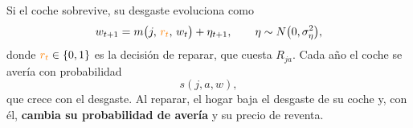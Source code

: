 \documentclass[border=0pt]{standalone}
\newcommand{\no}[1]{{\color{orange}#1}}
\begin{document}
\begin{minipage}{26.783cm}\fontsize{27}{33.5}\selectfont\raggedright 
Si el coche sobrevive, su desgaste evoluciona como
\[ w_{t+1}=m\big(j,\,\no{r_t},\,w_t\big)+\eta_{t+1},\qquad
   \eta\sim N\big(0,\sigma_\eta^2\big), \]
donde $\no{r_t}\in\{0,1\}$ es la decisión de reparar, que cuesta $R_{ja}$.
Cada año el coche se avería con probabilidad
\[ s(j,a,w), \]
que crece con el desgaste. Al reparar, el hogar baja el desgaste de su coche y, con
él, \textbf{cambia su probabilidad de avería} y su precio de reventa.
\end{minipage}
\end{document}
